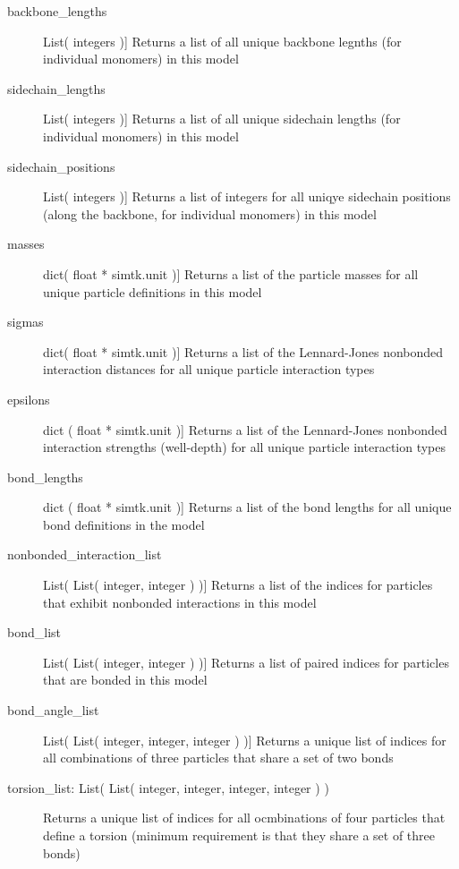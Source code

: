 \documentclass[letterpaper,12pt,english,openany,oneside]{sphinxmanual}
\begin{document}
\begin{fulllineitems}
\begin{description}
\item[{backbone\_lengths}] \leavevmode{[}List( integers ){]}
Returns a list of all unique backbone legnths (for individual monomers) in this model

\item[{sidechain\_lengths}] \leavevmode{[}List( integers ){]}
Returns a list of all unique sidechain lengths (for individual monomers) in this model

\item[{sidechain\_positions}] \leavevmode{[}List( integers ){]}
Returns a list of integers for all uniqye sidechain positions (along the backbone, for individual monomers) in this model

\item[{masses}] \leavevmode{[}dict( float * simtk.unit ){]}
Returns a list of the particle masses for all unique particle definitions in this model

\item[{sigmas}] \leavevmode{[}dict( float * simtk.unit ){]}
Returns a list of the Lennard-Jones nonbonded interaction distances for all unique particle interaction types

\item[{epsilons}] \leavevmode{[}dict ( float * simtk.unit ){]}
Returns a list of the Lennard-Jones nonbonded interaction strengths (well-depth) for all unique particle interaction types

\item[{bond\_lengths}] \leavevmode{[}dict ( float * simtk.unit ){]}
Returns a list of the bond lengths for all unique bond definitions in the model

\item[{nonbonded\_interaction\_list}] \leavevmode{[}List( List( integer, integer ) ){]}
Returns a list of the indices for particles that exhibit nonbonded interactions in this model

\item[{bond\_list}] \leavevmode{[}List( List( integer, integer ) ){]}
Returns a list of paired indices for particles that are bonded in this model

\item[{bond\_angle\_list}] \leavevmode{[}List( List( integer, integer, integer ) ){]}
Returns a unique list of indices for all combinations of three particles that share a set of two bonds

\item[{torsion\_list: List( List( integer, integer, integer, integer ) )}] \leavevmode
Returns a unique list of indices for all ocmbinations of four particles that define a torsion (minimum requirement is that they share a set of three bonds)


\end{description}
\end{fulllineitems}
\end{document}
